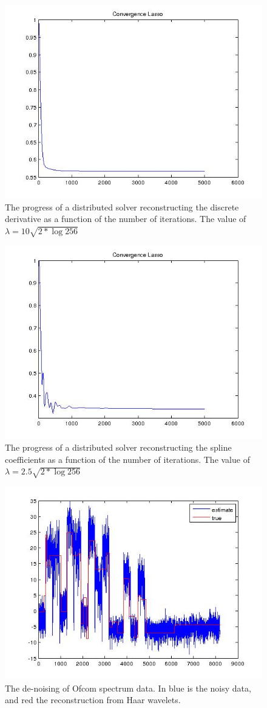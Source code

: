 \documentclass{article}
\begin{document}
\begin{appendices}
\begin{figure}[h]
\centering
\includegraphics[height = 7.3 cm]{steps_difference.jpg}
\caption{The progress of a distributed solver reconstructing the discrete derivative as a function of the number of iterations. The value of \( \lambda = 10\sqrt{2*\log{256}}\)}
\label{fig:steps_difference}
\end{figure}

\begin{figure}[h]
\centering
\includegraphics[height = 7.3 cm]{steps_splines.jpg}
\caption{The progress of a distributed solver reconstructing the spline coefficients as a function of the number of iterations. The value of \( \lambda = 2.5\sqrt{2*\log{256}}\)}
\label{fig:steps_splines}
\end{figure}

\begin{figure}[h]
\centering
\includegraphics[height = 7.3 cm]{real_reconstruction.jpg}
\caption{The de-noising of Ofcom spectrum data. In blue is the noisy data, and red the reconstruction from Haar wavelets.}
\label{fig:steps_splines}
\end{figure}

\end{appendices}


\end{document}
